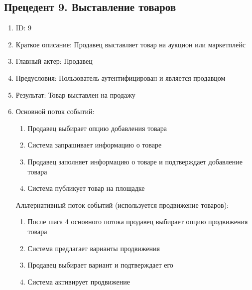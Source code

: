 \documentclass{article}
\begin{document}
\subsection{Прецедент 9. Выставление товаров}
\begin{enumerate}
    \item ID: 9
    \item Краткое описание: Продавец выставляет товар на аукцион или маркетплейс
    \item Главный актер: Продавец
    \item Предусловия: Пользователь аутентифицирован и является продавцом
    \item Результат: Товар выставлен на продажу
    \item Основной поток событий:
    \begin{enumerate}
        \item Продавец выбирает опцию добавления товара
        \item Система запрашивает информацию о товаре
        \item Продавец заполняет информацию о товаре и подтверждает добавление товара
        \item Система публикует товар на площадке
    \end{enumerate}
    Альтернативный поток событий (используется продвижение товаров):
    \begin{enumerate}
        \item После шага 4 основного потока продавец выбирает опцию продвижения товара
        \item Система предлагает варианты продвижения
        \item Продавец выбирает вариант и подтверждает его
        \item Система активирует продвижение
    \end{enumerate}
\end{enumerate}
\end{document}

